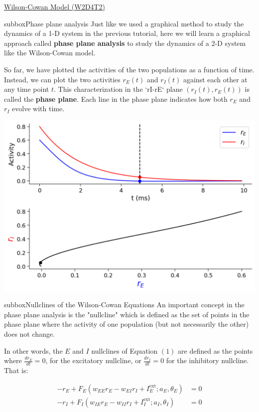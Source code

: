 \begin{textbox}{\href{https://compneuro.neuromatch.io/tutorials/W2D4_DynamicNetworks/chapter_title.html}{Wilson-Cowan Model (W2D4T2)} }
\begin{subbox}{subbox}{Phase plane analysis}
\scriptsize
Just like we used a graphical method to study the dynamics of a 1-D system in the previous tutorial, here we will learn a  graphical approach called \textbf{phase plane analysis} to study the dynamics of a 2-D system like the Wilson-Cowan model.

So far, we have plotted the activities of the two populations as a function of time. Instead, we can plot the two activities $r_E(t)$ and $r_I(t)$ against each other at any time point $t$. This characterization in the `rI-rE` plane $(r_I(t), r_E(t))$ is called the \textbf{phase plane}. Each line in the phase plane indicates how both $r_E$ and $r_I$ evolve with time.
\begin{center}
\includegraphics[scale=0.23]{Figures/DN/DN_Figure7.png}
\end{center}
\end{subbox}
\begin{subbox}{subbox}{Nullclines of the Wilson-Cowan Equations
}
\scriptsize
An important concept in the phase plane analysis is the "nullcline" which is defined as the set of points in the phase plane where the activity of one population (but not necessarily the other) does not change.

In other words, the $E$ and $I$ nullclines of Equation $(1)$ are defined as the points where $\displaystyle{\frac{dr_E}{dt}}=0$, for the excitatory nullcline, or $\displaystyle\frac{dr_I}{dt}=0$ for the inhibitory nullcline. That is:

\begin{align*}
-r_E + F_E(w_{EE}r_E -w_{EI}r_I + I^{\text{ext}}_E;a_E,\theta_E) &= 0  \\
-r_I + F_I(w_{IE}r_E -w_{II}r_I + I^{\text{ext}}_I;a_I,\theta_I) &= 0  
\end{align*}
\end{subbox}

\end{textbox}

